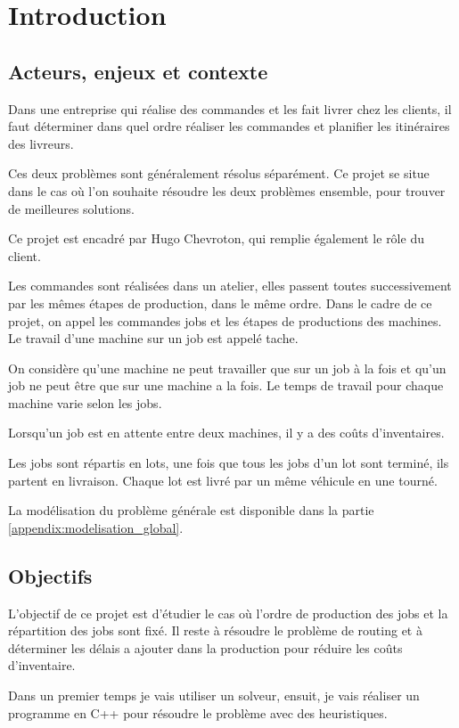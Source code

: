 \chapter{Introduction}

\section{Acteurs, enjeux et contexte}
Dans une entreprise qui réalise des commandes et les fait livrer chez les clients, il faut déterminer dans quel ordre réaliser les commandes et planifier les itinéraires des livreurs.

Ces deux problèmes sont généralement résolus séparément.
Ce projet se situe dans le cas où l'on souhaite résoudre les deux problèmes ensemble, pour trouver de meilleures solutions.

Ce projet est encadré par Hugo Chevroton, qui remplie également le rôle du client.

Les commandes sont réalisées dans un atelier, elles passent toutes successivement par les mêmes étapes de production, dans le même ordre.
Dans le cadre de ce projet, on appel les commandes jobs et les étapes de productions des machines.
Le travail d'une machine sur un job est appelé tache.

On considère qu'une machine ne peut travailler que sur un job à la fois et qu'un job ne peut être que sur une machine a la fois.
Le temps de travail pour chaque machine varie selon les jobs.

Lorsqu'un job est en attente entre deux machines, il y a des coûts d'inventaires.

Les jobs sont répartis en lots, une fois que tous les jobs d'un lot sont terminé, ils partent en livraison.
Chaque lot est livré par un même véhicule en une tourné.

La modélisation du problème générale est disponible dans la partie \autoref{appendix:modelisation_global}.

\section{Objectifs}
L'objectif de ce projet est d'étudier le cas où l'ordre de production des jobs et la répartition des jobs sont fixé.
Il reste à résoudre le problème de routing et à déterminer les délais a ajouter dans la production pour réduire les coûts d'inventaire.

Dans un premier temps je vais utiliser un solveur, ensuit, je vais réaliser un programme en C++ pour résoudre le problème avec des heuristiques.

